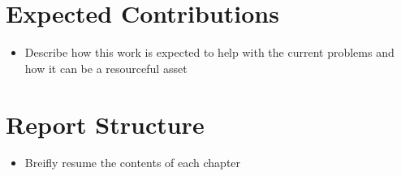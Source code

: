 \section{Expected Contributions}
\label{sec:expected_Contributions}

\begin{itemize}
    \item Describe how this work is expected to help with the current problems
    and how it can be a resourceful asset
\end{itemize}

\section{Report Structure}
\label{sec:report_structure}

\begin{itemize}
    \item Breifly resume the contents of each chapter
\end{itemize}